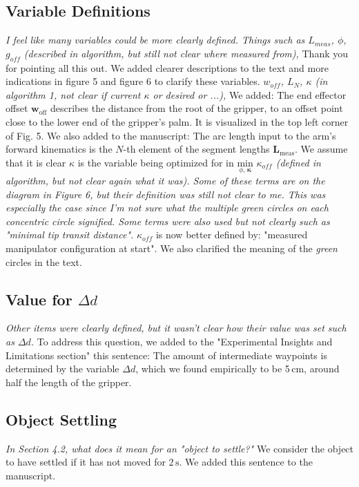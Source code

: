 \documentclass[letterpaper, 10 pt, twocolumn, conference]{article}
\newcommand{\unit}[1]{\ensuremath{\, \mathrm{#1}}} %
\begin{document}
\subsection{Variable Definitions}
\textit{I feel like many variables could be more clearly defined. Things such as $L_{meas}$, $\phi$, $g_{off}$ (described in algorithm, but still not clear where measured from),}
%
Thank you for pointing all this out. We added clearer descriptions to the text and more indications in figure 5 and figure 6 to clarify these variables.
%
\textit{$w_{off}$, $L_N$, $\kappa$ (in algorithm 1, not clear if current $\kappa$ or desired or ...),}
%
We added: The end effector offset $\mathbf{w}_{\textrm{off}}$ describes the distance from the root of the gripper, to an offset point close to the lower end of the gripper's palm. It is visualized in the top left corner of Fig. 5.
We also added to the manuscript: The arc length input to the arm's forward kinematics is the $N$-th element of the segment lengths $\mathbf{L}_{\textrm{meas}}$.
%
We assume that it is clear 
$\kappa$ is the variable being optimized for in $\underset{\phi, \, \boldsymbol{\kappa}}{\text{min}}$
%
\textit{$\kappa_{off}$ (defined in algorithm, but not clear again what it was). Some of these terms are on the diagram in Figure 6, but their definition was still not clear to me. This was especially the case since I'm not sure what the multiple green circles on each concentric circle signified. Some terms were also used but not clearly such as "minimal tip transit distance".}
%
$\kappa_{off}$  is now better defined by: "measured manipulator configuration at start". We also clarified the meaning of the \emph{green} circles in the text.
%
\subsection{Value for $\Delta d$}
\textit{Other items were clearly defined, but it wasn't clear how their value was set such as $\Delta d$.}
%
To address this question, we added to the "Experimental Insights and Limitations section" this sentence: 
The amount of intermediate waypoints is determined by the variable $\Delta d$, which we found empirically to be 5\unit{cm}, around half the length of the gripper.
%
\subsection{Object Settling}
\textit{In Section 4.2, what does it mean for an "object to settle?"}
%
We consider the object to have settled if it has not moved for 2\unit{s}. We added this sentence to the manuscript.
%
\end{document}
